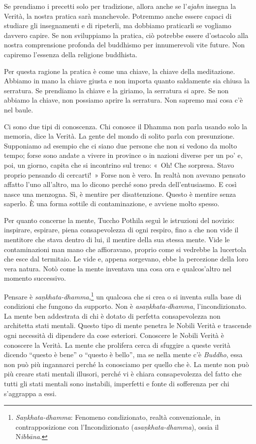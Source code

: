 Se prendiamo i precetti solo per tradizione, allora anche se
l'\emph{ajahn} insegna la Verità, la nostra pratica sarà manchevole.
Potremmo anche essere capaci di studiare gli insegnamenti e di
ripeterli, ma dobbiamo praticarli se vogliamo davvero capire. Se non
sviluppiamo la pratica, ciò potrebbe essere d'ostacolo alla nostra
comprensione profonda del buddhismo per innumerevoli vite future. Non
capiremo l'essenza della religione buddhista.

Per questa ragione la pratica è come una chiave, la chiave della
meditazione. Abbiamo in mano la chiave giusta e non importa quanto
saldamente sia chiusa la serratura. Se prendiamo la chiave e la giriamo,
la serratura si apre. Se non abbiamo la chiave, non possiamo aprire la
serratura. Non sapremo mai cosa c'è nel baule.

Ci sono due tipi di conoscenza. Chi conosce il Dhamma non parla usando
solo la memoria, dice la Verità. La gente del mondo di solito parla con
presunzione. Supponiamo ad esempio che ci siano due persone che non si
vedono da molto tempo; forse sono andate a vivere in province o in
nazioni diverse per un po' e, poi, un giorno, capita che si incontrino
sul treno: «~Oh! Che sorpresa. Stavo proprio pensando di cercarti!~»
Forse non è vero. In realtà non avevano pensato affatto l'uno all'altro,
ma lo dicono perché sono preda dell'entusiasmo. E così nasce una
menzogna. Sì, è mentire per disattenzione. Questo è mentire senza
saperlo. È una forma sottile di contaminazione, e avviene molto spesso.

Per quanto concerne la mente, Tuccho Pothila seguì le istruzioni del
novizio: inspirare, espirare, piena consapevolezza di ogni respiro, fino
a che non vide il mentitore che stava dentro di lui, il mentire della
sua stessa mente. Vide le contaminazioni man mano che affioravano,
proprio come si vedrebbe la lucertola che esce dal termitaio. Le vide e,
appena sorgevano, ebbe la percezione della loro vera natura. Notò come
la mente inventava una cosa ora e qualcos'altro nel momento successivo.

Pensare è \emph{saṇkhata-dhamma},\footnote{\emph{Saṇkhata-dhamma}:
  Fenomeno condizionato, realtà convenzionale, in contrapposizione con
  l'Incondizionato (\emph{asaṇkhata-dhamma}), ossia il N\emph{ibbāna}.}
un qualcosa che si crea o si inventa sulla base di condizioni che
fungono da supporto. Non è \emph{asaṇkhata-dhamma}, l'incondizionato. La
mente ben addestrata di chi è dotato di perfetta consapevolezza non
architetta stati mentali. Questo tipo di mente penetra le Nobili Verità
e trascende ogni necessità di dipendere da cose esteriori. Conoscere le
Nobili Verità è conoscere la Verità. La mente che prolifera cerca di
sfuggire a queste verità dicendo ``questo è bene'' o ``questo è bello'',
ma se nella mente c'è \emph{Buddho}, essa non può più ingannarci perché
la conosciamo per quello che è. La mente non può più creare stati
mentali illusori, perché vi è chiara consapevolezza del fatto che tutti
gli stati mentali sono instabili, imperfetti e fonte di sofferenza per
chi s'aggrappa a essi.

